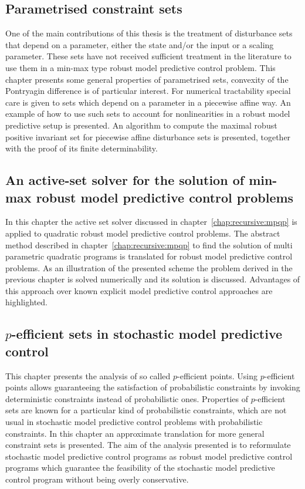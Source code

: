 \documentclass{article}
\begin{document}
\subsection{Parametrised constraint sets}\label{chap:mrpi:sets}
One of the main contributions of this thesis is the treatment of disturbance sets that depend on a parameter,
either the state and/or the input or a scaling parameter.
%
These sets have not received sufficient treatment in the literature to use them in a min-max type robust
model predictive control problem.
%
This chapter presents some general properties of parametrised sets, convexity of the Pontryagin difference
is of particular interest.
%
For numerical tractability special care is given to sets which depend on a parameter in a piecewise affine way.
%
An example of how to use such sets to account for nonlinearities in a robust model predictive setup is presented.
%
An algorithm to compute the maximal robust positive invariant set for piecewise affine disturbance sets is presented,
together with the proof of its finite determinability.

\subsection{An active-set solver for the solution of min-max robust model predictive control problems}
In this chapter the active set solver discussed in chapter~\ref{chap:recursive:mpqp} is applied to quadratic
robust model predictive control problems.
%
The abstract method described in chapter~\ref{chap:recursive:mpqp} to find the solution of multi parametric quadratic
programs is translated for robust model predictive control problems.
%
As an illustration of the presented scheme the problem derived in the previous chapter is solved numerically and its solution
is discussed.
%
Advantages of this approach over known explicit model predictive control approaches are highlighted.

\subsection{$p$-efficient sets in stochastic model predictive control}
This chapter presents the analysis of so called $p$-efficient points.
%
Using $p$-efficient points allows guaranteeing the satisfaction of probabilistic constraints by invoking deterministic
constraints instead of probabilistic ones.
%
Properties of $p$-efficient sets are known for a particular kind of probabilistic constraints, which are not usual
in stochastic model predictive control problems with probabilistic constraints.
%
In this chapter an approximate translation for more general constraint sets is presented.
%
The aim of the analysis presented is to reformulate stochastic model predictive control programs as robust model predictive
control programs which guarantee the feasibility of the stochastic model predictive control program without being overly
conservative.
\end{document}
